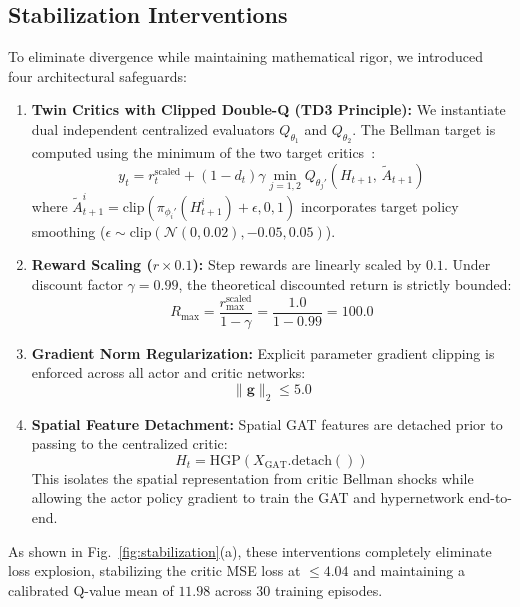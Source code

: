 \documentclass[journal]{IEEEtran}
\begin{document}
\subsection{Stabilization Interventions}
To eliminate divergence while maintaining mathematical rigor, we introduced four architectural safeguards:
\begin{enumerate}
    \item \textbf{Twin Critics with Clipped Double-Q (TD3 Principle):} We instantiate dual independent centralized evaluators $Q_{\theta_1}$ and $Q_{\theta_2}$. The Bellman target is computed using the minimum of the two target critics~\cite{fujimoto2018addressing}:
    \begin{equation}
    y_t = r_t^{\text{scaled}} + (1 - d_t) \gamma \min_{j=1,2} Q_{\theta_j'}\left(H_{t+1}, \, \tilde{A}_{t+1}\right)
    \label{eq:clipped_double_q}
    \end{equation}
    where $\tilde{A}_{t+1}^i = \text{clip}\left(\pi_{\phi_i'}(H_{t+1}^i) + \epsilon, 0, 1\right)$ incorporates target policy smoothing ($\epsilon \sim \text{clip}(\mathcal{N}(0, 0.02), -0.05, 0.05)$).
    \item \textbf{Reward Scaling ($r \times 0.1$):} Step rewards are linearly scaled by $0.1$. Under discount factor $\gamma = 0.99$, the theoretical discounted return is strictly bounded:
    \begin{equation}
    R_{\max} = \frac{r_{\max}^{\text{scaled}}}{1 - \gamma} = \frac{1.0}{1 - 0.99} = 100.0
    \end{equation}
    \item \textbf{Gradient Norm Regularization:} Explicit parameter gradient clipping is enforced across all actor and critic networks:
    \begin{equation}
    \|\mathbf{g}\|_2 \le 5.0
    \end{equation}
    \item \textbf{Spatial Feature Detachment:} Spatial GAT features are detached prior to passing to the centralized critic:
    \begin{equation}
    H_t = \text{HGP}\left(X_{\text{GAT}}.\text{detach}()\right)
    \end{equation}
    This isolates the spatial representation from critic Bellman shocks while allowing the actor policy gradient to train the GAT and hypernetwork end-to-end.
\end{enumerate}

As shown in Fig.~\ref{fig:stabilization}(a), these interventions completely eliminate loss explosion, stabilizing the critic MSE loss at $\le 4.04$ and maintaining a calibrated Q-value mean of $11.98$ across 30 training episodes.
\end{document}
